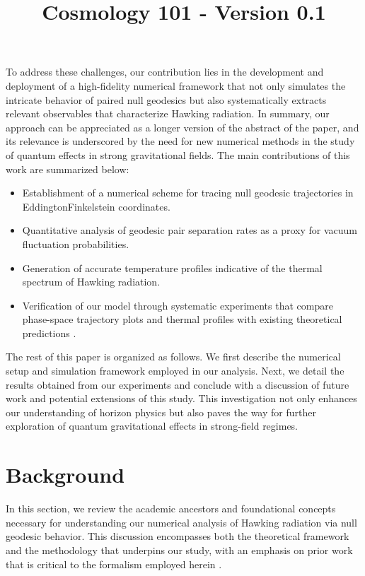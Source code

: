 \documentclass{article}\usepackage{graphicx} \usepackage{amsmath} \usepackage{colortbl}\title{Cosmology 101 - Version 0.1}
\begin{document}
To address these challenges, our contribution lies in the development and deployment of a high-fidelity numerical framework that not only simulates the intricate behavior of paired null geodesics but also systematically extracts relevant observables that characterize Hawking radiation. In summary, our approach can be appreciated as a longer version of the abstract of the paper, and its relevance is underscored by the need for new numerical methods in the study of quantum effects in strong gravitational fields. The main contributions of this work are summarized below:
\begin{itemize}
    \item Establishment of a numerical scheme for tracing null geodesic trajectories in Eddington\textendash Finkelstein coordinates.
    \item Quantitative analysis of geodesic pair separation rates as a proxy for vacuum fluctuation probabilities.
    \item Generation of accurate temperature profiles indicative of the thermal spectrum of Hawking radiation.
    \item Verification of our model through systematic experiments that compare phase-space trajectory plots and thermal profiles with existing theoretical predictions \cite{Unruh1976}.
\end{itemize}

The rest of this paper is organized as follows. We first describe the numerical setup and simulation framework employed in our analysis. Next, we detail the results obtained from our experiments and conclude with a discussion of future work and potential extensions of this study. This investigation not only enhances our understanding of horizon physics but also paves the way for further exploration of quantum gravitational effects in strong-field regimes.

\section{Background}
In this section, we review the academic ancestors and foundational concepts necessary for understanding our numerical analysis of Hawking radiation via null geodesic behavior. This discussion encompasses both the theoretical framework and the methodology that underpins our study, with an emphasis on prior work that is critical to the formalism employed herein \cite{Hawking1975,Jacobson1993,Unruh1976}.
\end{document}

